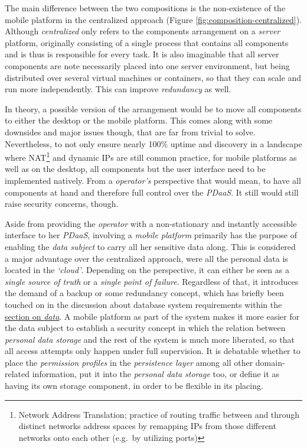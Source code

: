 \documentclass[12pt,english,a4paper,titlepage,cleardoublepage=empty,dottedtoc]{report}
\begin{document}
The main difference between the two compositions is the non-existence of
the mobile platform in the centralized approach (Figure
\ref{fig:composition-centralized}). Although \emph{centralized} only
refers to the components arrangement on a \emph{server} platform,
originally consisting of a single process that contains all components
and is thus is responsible for every task. It is also imaginable that
all server components are note necessarily placed into one server
environment, but being distributed over several virtual machines or
containers, so that they can scale and run more independently. This can
improve \emph{redundancy} as well.

In theory, a possible version of the arrangement would be to move all
components to either the desktop or the mobile platform. This comes
along with some downsides and major issues though, that are far from
trivial to solve. Nevertheless, to not only ensure nearly 100\% uptime
and discovery in a landscape where NAT\footnote{Network Address
  Translation; practice of routing traffic between and through distinct
  networks address spaces by remapping IPs from those different networks
  onto each other (e.g.~by utilizing ports)} and dynamic IPs are still
common practice, for mobile platforms as well as on the desktop, all
components but the user interface need to be implemented natively. From
a \emph{operator's} perspective that would mean, to have all components
at hand and therefore full control over the \emph{PDaaS}. It still would
still raise security concerns, though.

Aside from providing the \emph{operator} with a non-stationary and
instantly accessible interface to her \emph{PDaaS}, involving a
\emph{mobile platform} primarily has the purpose of enabling the
\emph{data subject} to carry all her sensitive data along. This is
considered a major advantage over the centralized approach, were all the
personal data is located in the \emph{`cloud'}. Depending on the
perspective, it can either be seen as a \emph{single source of truth} or
a \emph{single point of failure}. Regardless of that, it introduces the
demand of a backup or some redundancy concept, which has briefly been
touched on in the discussion about database system requirements within
the \protect\hyperlink{data}{section on \emph{data}}. A mobile platform
as part of the system makes it more easier for the data subject to
establish a security concept in which the relation between
\emph{personal data storage} and the rest of the system is much more
liberated, so that all access attempts only happen under full
supervision. It is debatable whether to place the \emph{permission
profiles} in the \emph{persistence layer} among all other domain-related
information, put it into the \emph{personal data storage} too, or define
it as having its own storage component, in order to be flexible in its
placing.
\end{document}
